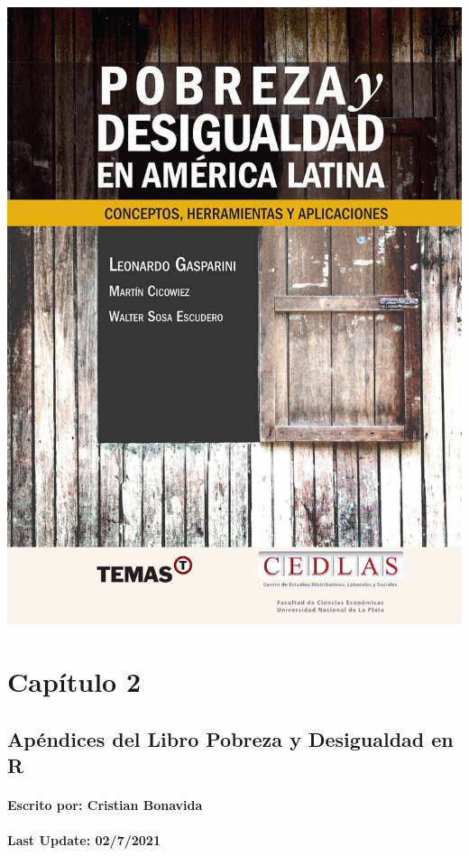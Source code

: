 \documentclass[
]{book}
\begin{document}
\begin{center}\includegraphics[width=0.8\linewidth]{portada_libro} \end{center}

\hypertarget{capuxedtulo-2}{%
\chapter{Capítulo 2}\label{capuxedtulo-2}}

\hypertarget{apuxe9ndices-del-libro-pobreza-y-desigualdad-en-r}{%
\section*{Apéndices del Libro Pobreza y Desigualdad en R}\label{apuxe9ndices-del-libro-pobreza-y-desigualdad-en-r}}

\hypertarget{escrito-por-cristian-bonavida}{%
\subsubsection*{Escrito por: Cristian Bonavida}\label{escrito-por-cristian-bonavida}}

\hypertarget{last-update-0272021}{%
\subsubsection*{Last Update: 02/7/2021}\label{last-update-0272021}}
\end{document}
